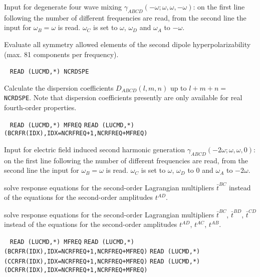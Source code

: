 \begin{description}
Input for degenerate four wave mixing
$\gamma_{ABCD}(-\omega;\omega,\omega,-\omega)$:
on the first line following  the number of different
frequencies are read, from the second line the input for
$\omega_B = \omega$ is read. $\omega_C$ is set to $\omega$,
$\omega_D$ and $\omega_A$ to $-\omega$. 
 
\item[\Key{DIPOLE}] 
Evaluate all symmetry allowed elements of the second dipole
hyperpolarizability (max. 81 components per frequency).

\item[\Key{DISPCF}] \verb| |\newline
\verb|READ (LUCMD,*) NCRDSPE| 

Calculate the dispersion coefficients $D_{ABCD}(l,m,n)$ up  to
$l+m+n = $ \verb+NCRDSPE+.
Note that dispersion coefficients presently are only available for
real fourth-order properties.
 
 
\item[\Key{ESHGFR}] \verb| |\newline
\verb|READ (LUCMD,*) MFREQ|\newline
\verb|READ (LUCMD,*) (BCRFR(IDX),IDX=NCRFREQ+1,NCRFREQ+MFREQ)|

Input for electric field induced second harmonic generation
$\gamma_{ABCD}(-2\omega;\omega,\omega,0)$:
on the first line following  the number of different
frequencies are read, from the second line the input for
$\omega_B = \omega$ is read. $\omega_C$ is set to $\omega$,
$\omega_D$ to $0$ and $\omega_A$ to $-2\omega$. 
 
\item[\Key{L2 BC}] solve response equations for the second-order
Lagrangian multipliers $\bar{t}^{BC}$ instead of the equations for 
the second-order amplitudes $t^{AD}$.
 
\item[\Key{L2 BCD}] solve response equations for the second-order
Lagrangian multipliers $\bar{t}^{BC}$, $\bar{t}^{BD}$, $\bar{t}^{CD}$
instead of the equations for the second-order amplitudes
$t^{AD}$, $t^{AC}$, $t^{AB}$.
 
\item[\Key{MIXFRE}] \verb| |\newline
\verb|READ (LUCMD,*) MFREQ|\newline
\verb|READ (LUCMD,*) (BCRFR(IDX),IDX=NCRFREQ+1,NCRFREQ+MFREQ)|\newline
\verb|READ (LUCMD,*) (CCRFR(IDX),IDX=NCRFREQ+1,NCRFREQ+MFREQ)|\newline
\verb|READ (LUCMD,*) (DCRFR(IDX),IDX=NCRFREQ+1,NCRFREQ+MFREQ)|


\end{description}
